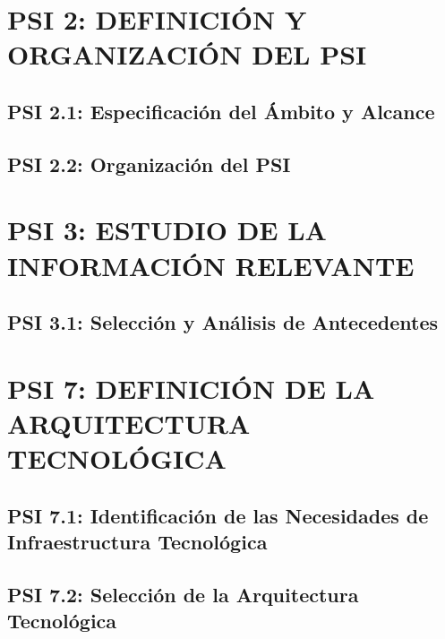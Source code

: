 \newpage
\section{PSI 2: DEFINICIÓN Y ORGANIZACIÓN DEL PSI}
 

\subsection{PSI 2.1: Especificación del Ámbito y Alcance} 


\subsection{PSI 2.2: Organización del PSI}



\newpage
\section{PSI 3: ESTUDIO DE LA INFORMACIÓN RELEVANTE}
 
\subsection{PSI 3.1: Selección y Análisis de Antecedentes} 




\newpage

\section{PSI 7: DEFINICIÓN DE LA ARQUITECTURA TECNOLÓGICA}
\subsection{PSI 7.1: Identificación de las Necesidades de Infraestructura Tecnológica} 


\subsection{PSI 7.2: Selección de la Arquitectura Tecnológica} 
